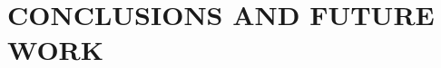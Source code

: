\documentclass[letterpaper]{article}
\begin{document}
\section{CONCLUSIONS AND FUTURE WORK}\label{conclusions-and-future-work}
\lipsum[1-1]











\end{document}
